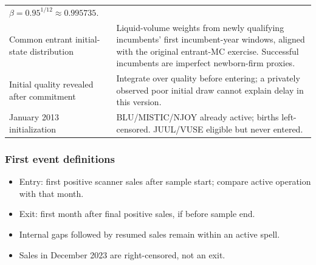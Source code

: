 \documentclass[11pt,]{article}
\providecommand{\tightlist}{%
  \setlength{\itemsep}{0pt}\setlength{\parskip}{0pt}}
\begin{document}
\begin{longtable}[]{@{}ll@{}}
\begin{minipage}[t]{0.62\columnwidth}
\(\beta=0.95^{1/12}\approx0.995735\).\strut
\end{minipage}\tabularnewline
\begin{minipage}[t]{0.32\columnwidth}\raggedright\strut
Common entrant initial-state distribution\strut
\end{minipage} & \begin{minipage}[t]{0.62\columnwidth}\raggedright\strut
Liquid-volume weights from newly qualifying incumbents' first
incumbent-year windows, aligned with the original entrant-MC exercise.
Successful incumbents are imperfect newborn-firm proxies.\strut
\end{minipage}\tabularnewline
\begin{minipage}[t]{0.32\columnwidth}\raggedright\strut
Initial quality revealed after commitment\strut
\end{minipage} & \begin{minipage}[t]{0.62\columnwidth}\raggedright\strut
Integrate over quality before entering; a privately observed poor
initial draw cannot explain delay in this version.\strut
\end{minipage}\tabularnewline
\begin{minipage}[t]{0.32\columnwidth}\raggedright\strut
January 2013 initialization\strut
\end{minipage} & \begin{minipage}[t]{0.62\columnwidth}\raggedright\strut
BLU/MISTIC/NJOY already active; births left-censored. JUUL/VUSE eligible
but never entered.\strut
\end{minipage}\tabularnewline
\bottomrule
\end{longtable}

\subsubsection{First event definitions}\label{first-event-definitions}

\begin{itemize}
\tightlist
\item
  Entry: first positive scanner sales after sample start; compare active
  operation with that month.
\item
  Exit: first month after final positive sales, if before sample end.
\item
  Internal gaps followed by resumed sales remain within an active spell.
\item
  Sales in December 2023 are right-censored, not an exit.
\end{itemize}
\end{document}
